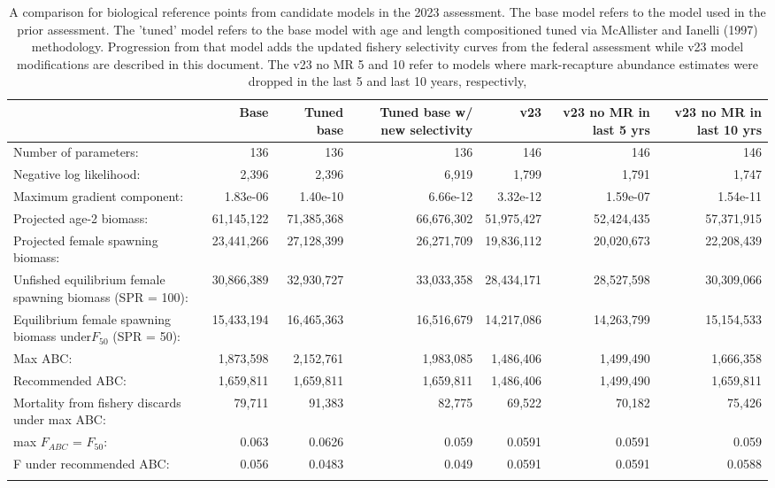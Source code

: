 \documentclass[
]{article}
\begin{document}
\begin{longtable}[t]{lrrrrrr}
\caption{\label{tab:modcomp}A comparison for biological reference points from candidate models in the 2023 assessment.  The base model refers to the model used in the prior assessment.  The 'tuned' model refers to the base model with age and length compositioned tuned via McAllister and Ianelli (1997) methodology.  Progression from that model adds the updated fishery selectivity curves from the federal assessment while v23 model modifications are described in this document.  The v23 no MR 5 and 10 refer to models where mark-recapture abundance estimates were dropped in the last 5 and last 10 years, respectivly,}\\
\toprule
 & Base & Tuned base & Tuned base w/ new selectivity & v23 & v23 no MR in last 5 yrs & v23 no MR in last 10 yrs\\
\midrule
Number of parameters: & 136 & 136 & 136 & 146 & 146 & 146\\
Negative log likelihood: & 2,396 & 2,396 & 6,919 & 1,799 & 1,791 & 1,747\\
Maximum gradient component: & 1.83e-06 & 1.40e-10 & 6.66e-12 & 3.32e-12 & 1.59e-07 & 1.54e-11\\
Projected age-2 biomass: & 61,145,122 & 71,385,368 & 66,676,302 & 51,975,427 & 52,424,435 & 57,371,915\\
Projected female spawning biomass: & 23,441,266 & 27,128,399 & 26,271,709 & 19,836,112 & 20,020,673 & 22,208,439\\
\addlinespace
Unfished equilibrium female spawning biomass (SPR = 100): & 30,866,389 & 32,930,727 & 33,033,358 & 28,434,171 & 28,527,598 & 30,309,066\\
Equilibrium female spawning biomass under$F_{50}$ (SPR = 50): & 15,433,194 & 16,465,363 & 16,516,679 & 14,217,086 & 14,263,799 & 15,154,533\\
Max ABC: & 1,873,598 & 2,152,761 & 1,983,085 & 1,486,406 & 1,499,490 & 1,666,358\\
Recommended ABC: & 1,659,811 & 1,659,811 & 1,659,811 & 1,486,406 & 1,499,490 & 1,659,811\\
Mortality from fishery discards under max ABC: & 79,711 & 91,383 & 82,775 & 69,522 & 70,182 & 75,426\\
\addlinespace
max $F_{ABC}$ = $F_{50}$: & 0.063 & 0.0626 & 0.059 & 0.0591 & 0.0591 & 0.059\\
F under recommended ABC: & 0.056 & 0.0483 & 0.049 & 0.0591 & 0.0591 & 0.0588\\
 &  &  &  &  &  & \\
\bottomrule
\end{longtable}
\end{document}
